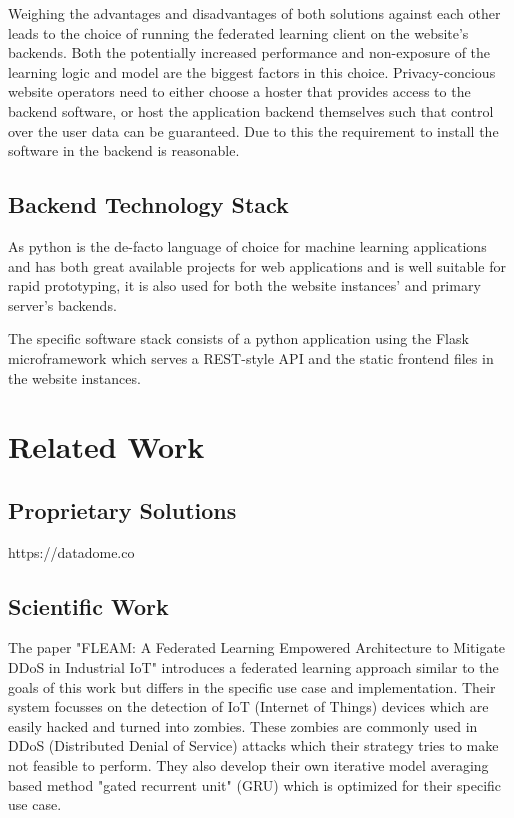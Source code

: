 \documentclass[
    fontsize=12pt,
    headings=small,
    parskip=half,           %
    bibliography=totoc,
    numbers=noenddot,       %
    open=any,               %
    ]{scrreprt}
\begin{document}
Weighing the advantages and disadvantages of both solutions against each other leads to the choice of running the federated learning client on the website's backends. Both the potentially increased performance and non-exposure of the learning logic and model are the biggest factors in this choice. Privacy-concious website operators need to either choose a hoster that provides access to the backend software, or host the application backend themselves such that control over the user data can be guaranteed. Due to this the requirement to install the software in the backend is reasonable.

\section{Backend Technology Stack}

As python is the de-facto language of choice for machine learning applications and has both great available projects for web applications and is well suitable for rapid prototyping, it is also used for both the website instances' and primary server's backends.

The specific software stack consists of a python application using the Flask microframework which serves a REST-style API and the static frontend files in the website instances.


\chapter{Related Work}

\section{Proprietary Solutions}

https://datadome.co

\section{Scientific Work}

The paper "FLEAM: A Federated Learning Empowered Architecture to Mitigate DDoS in Industrial IoT" \cite{LiJi2021} introduces a federated learning approach similar to the goals of this work but differs in the specific use case and implementation. Their system focusses on the detection of IoT (Internet of Things) devices which are easily hacked and turned into zombies. These zombies are commonly used in DDoS (Distributed Denial of Service) attacks which their strategy tries to make not feasible to perform. They also develop their own iterative model averaging based method "gated recurrent unit" (GRU) which is optimized for their specific use case.
\end{document}

